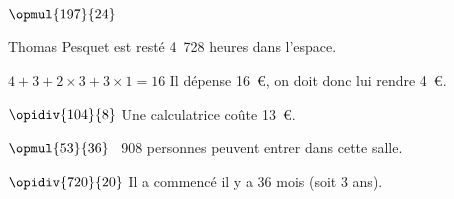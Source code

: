 \exo{}

$\opmul{197}{24}$

\bigskip
Thomas Pesquet est resté 4~728 heures dans l'espace.

\exo{}


$4+3+2\times3+3\times1=16$ \quad Il dépense 16~\euro{}, on doit donc lui rendre 4~\euro{}.


\exo{}

$\opidiv{104}{8}$ \quad Une calculatrice coûte 13~\euro{}.

\exo{}

$\opmul{53}{36}$ ~908 personnes peuvent entrer dans cette salle.

\exo{}

$\opidiv{720}{20}$ \quad Il a commencé il y a 36 mois (soit 3 ans).